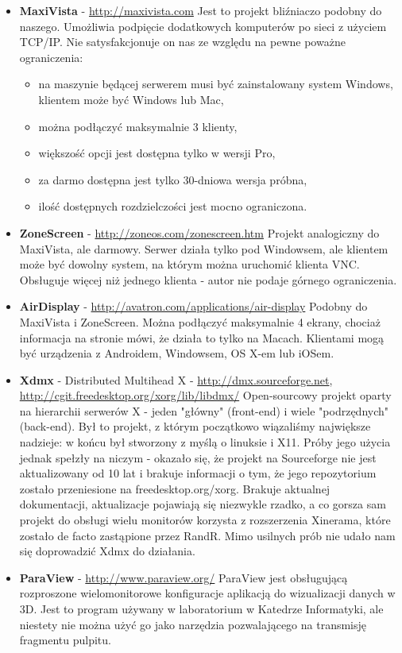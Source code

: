     \begin{itemize}
      \item \textbf{MaxiVista} - \url{http://maxivista.com}
        Jest to projekt bliźniaczo podobny do naszego. Umożliwia podpięcie dodatkowych komputerów po sieci z użyciem TCP/IP. Nie satysfakcjonuje on nas ze względu na pewne poważne ograniczenia:
        \begin{itemize}
          \item na maszynie będącej serwerem musi być zainstalowany system Windows, klientem może być Windows lub Mac,
          \item można podłączyć maksymalnie 3 klienty,
          \item większość opcji jest dostępna tylko w wersji Pro,
          \item za darmo dostępna jest tylko 30-dniowa wersja próbna,
          \item ilość dostępnych rozdzielczości jest mocno ograniczona.
        \end{itemize}

      \item \textbf{ZoneScreen} - \url{http://zoneos.com/zonescreen.htm}
        Projekt analogiczny do MaxiVista, ale darmowy. Serwer działa tylko pod Windowsem, ale klientem może być dowolny system, na którym można uruchomić klienta VNC. Obsługuje więcej niż jednego klienta - autor nie podaje górnego ograniczenia.

      \item \textbf{AirDisplay} - \url{http://avatron.com/applications/air-display}
        Podobny do MaxiVista i ZoneScreen. Można podłączyć maksymalnie 4 ekrany, chociaż informacja na stronie mówi, że działa to tylko na Macach. Klientami mogą być urządzenia z Androidem, Windowsem, OS X-em lub iOSem.

      \item \textbf{Xdmx} - Distributed Multihead X - \url{http://dmx.sourceforge.net}, \url{http://cgit.freedesktop.org/xorg/lib/libdmx/}
        Open-sourcowy projekt oparty na hierarchii serwerów X - jeden "główny" (front-end) i wiele "podrzędnych" (back-end). Był to projekt, z którym początkowo wiązaliśmy największe nadzieje: w końcu był stworzony z myślą o linuksie i X11. Próby jego użycia jednak spełzły na niczym - okazało się, że projekt na Sourceforge nie jest aktualizowany od 10 lat i brakuje informacji o tym, że jego repozytorium zostało przeniesione na freedesktop.org/xorg. Brakuje aktualnej dokumentacji, aktualizacje pojawiają się niezwykle rzadko, a co gorsza sam projekt do obsługi wielu monitorów korzysta z rozszerzenia Xinerama, które zostało de facto zastąpione przez RandR. Mimo usilnych prób nie udało nam się doprowadzić Xdmx do działania.

      \item \textbf{ParaView} - \url{http://www.paraview.org/}
        ParaView jest obsługującą rozproszone wielomonitorowe konfiguracje aplikacją do wizualizacji danych w 3D. Jest to program używany w laboratorium w Katedrze Informatyki, ale niestety nie można użyć go jako narzędzia pozwalającego na transmisję fragmentu pulpitu.
    \end{itemize}

